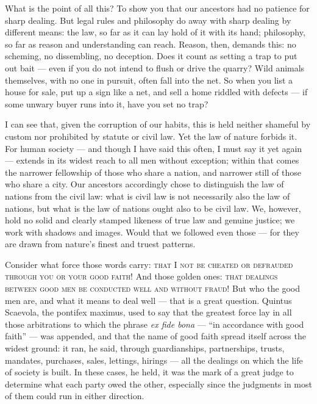  What is the point of all this? To show you that our ancestors had no patience for sharp dealing. But legal rules and philosophy do away with sharp dealing by different means: the law, so far as it can lay hold of it with its hand; philosophy, so far as reason and understanding can reach. Reason, then, demands this: no scheming, no dissembling, no deception. Does it count as setting a trap to put out bait — even if you do not intend to flush or drive the quarry? Wild animals themselves, with no one in pursuit, often fall into the net. So when you list a house for sale, put up a sign like a net, and sell a home riddled with defects — if some unwary buyer runs into it, have you set no trap?

 I can see that, given the corruption of our habits, this is held neither shameful by custom nor prohibited by statute or civil law. Yet the law of nature forbids it. For human society — and though I have said this often, I must say it yet again — extends in its widest reach to all men without exception; within that comes the narrower fellowship of those who share a nation, and narrower still of those who share a city. Our ancestors accordingly chose to distinguish the law of nations from the civil law: what is civil law is not necessarily also the law of nations, but what is the law of nations ought also to be civil law. We, however, hold no solid and clearly stamped likeness of true law and genuine justice; we work with shadows and images. Would that we followed even those — for they are drawn from nature's finest and truest patterns.

 Consider what force those words carry: \textsc{that I not be cheated or defrauded through you or your good faith!} And those golden ones: \textsc{that dealings between good men be conducted well and without fraud!} But who the good men are, and what it means to deal well — that is a great question. Quintus Scaevola, the pontifex maximus, used to say that the greatest force lay in all those arbitrations to which the phrase \textit{ex fide bona} — ``in accordance with good faith'' — was appended, and that the name of good faith spread itself across the widest ground: it ran, he said, through guardianships, partnerships, trusts, mandates, purchases, sales, lettings, hirings — all the dealings on which the life of society is built. In these cases, he held, it was the mark of a great judge to determine what each party owed the other, especially since the judgments in most of them could run in either direction.

